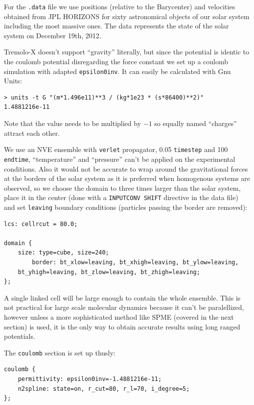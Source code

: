 For the \texttt{.data} file we use positions (relative to the
Barycenter) and velocities obtained from JPL HORIZONS for sixty
astronomical objects of our solar system including the most massive
ones. The data represents the state of the solar system on December
19th, 2012.

Tremolo-X doesn't support ``gravity'' literally, but since the potential
is identic to the coulomb potential disregarding the force constant we
set up a coulomb simulation with adapted \texttt{epsilon0inv}. It can
easily be calculated with Gnu Units:
\begin{lstlisting}
> units -t G "(m*1.496e11)**3 / (kg*1e23 * (s*86400)**2)"
1.4881216e-11
\end{lstlisting}
Note that the value needs to be multiplied by $-1$ so equally named
``charges'' attract each other.

We use an NVE ensemble with \texttt{verlet} propagator,
\SI{0.05}{\siday} \texttt{timestep} and \SI{100}{\siyear} \texttt{endtime},
``temperature'' and ``pressure'' can't be applied on the experimental
conditions. Also it would not be accurate to wrap around the
gravitational forces at the borders of the solar system as it is
preferred when homogenous systems are observed, so we choose the domain
to three times larger than the solar system, place it in the center
(done with a \texttt{INPUTCONV SHIFT} directive in the data file) and
set \texttt{leaving} boundary conditions (particles passing the border
are removed):

\begin{lstlisting}
lcs: cellrcut = 80.0;

domain {
    size: type=cube, size=240;
        border: bt_xlow=leaving, bt_xhigh=leaving, bt_ylow=leaving,
    bt_yhigh=leaving, bt_zlow=leaving, bt_zhigh=leaving;
};
\end{lstlisting}

A single linked cell will be large enough to contain the whole
ensemble. This is not practical for large scale molecular dynamics
because it can't be paralellized, however unless a more sophisticated
method like SPME (covered in the next section) is used, it is the only
way to obtain accurate results using long ranged potentials.

The \texttt{coulomb} section is set up thusly:

\begin{lstlisting}
coulomb {
    permittivity: epsilon0inv=-1.4881216e-11;
    n2spline: state=on, r_cut=80, r_l=70, i_degree=5;
};
\end{lstlisting}

